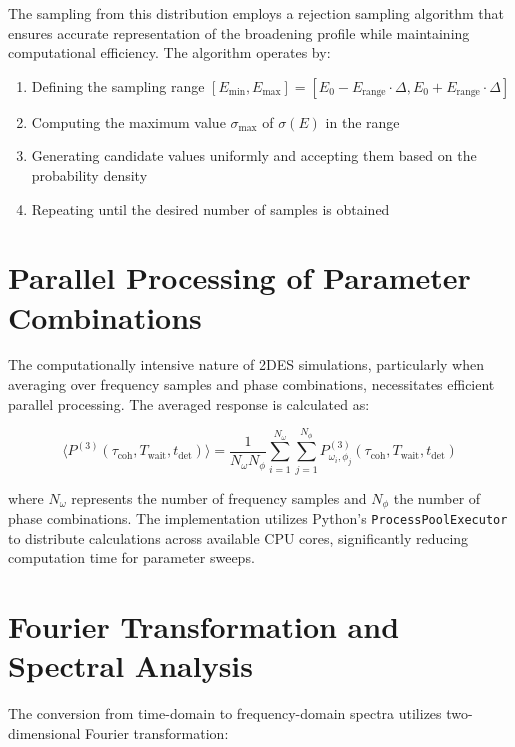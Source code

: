 \noindent
The sampling from this distribution employs a rejection sampling algorithm that ensures accurate representation of the broadening profile while maintaining computational efficiency. The algorithm operates by:

\begin{enumerate}
	\item Defining the sampling range $[E_{\text{min}}, E_{\text{max}}] = [E_0 - E_{\text{range}} \cdot \Delta, E_0 + E_{\text{range}} \cdot \Delta]$
	\item Computing the maximum value $\sigma_{\text{max}}$ of $\sigma(E)$ in the range
	\item Generating candidate values uniformly and accepting them based on the probability density
	\item Repeating until the desired number of samples is obtained
\end{enumerate}

\section{Parallel Processing of Parameter Combinations}
\label{sec:parallel_processing}

\noindent
The computationally intensive nature of 2DES simulations, particularly when averaging over frequency samples and phase combinations, necessitates efficient parallel processing. The averaged response is calculated as:

\begin{equation}
	\label{eq:averaged_response}
	\langle P^{(3)}(\tau_{\text{coh}}, T_{\text{wait}}, t_{\text{det}}) \rangle = \frac{1}{N_\omega N_\phi} \sum_{i=1}^{N_\omega} \sum_{j=1}^{N_\phi} P^{(3)}_{\omega_i, \phi_j}(\tau_{\text{coh}}, T_{\text{wait}}, t_{\text{det}})
\end{equation}

\noindent
where $N_\omega$ represents the number of frequency samples and $N_\phi$ the number of phase combinations. The implementation utilizes Python's \texttt{ProcessPoolExecutor} to distribute calculations across available CPU cores, significantly reducing computation time for parameter sweeps.

\section{Fourier Transformation and Spectral Analysis}
\label{sec:fourier_transformation}

\noindent
The conversion from time-domain to frequency-domain spectra utilizes two-dimensional Fourier transformation:

